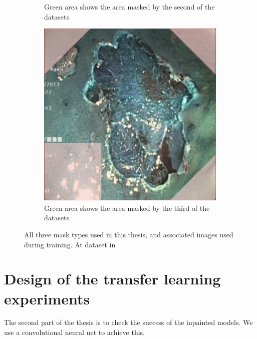 \begin{figure}
\begin{subfigure}[b]{0.3\textwidth}
         \caption{Green area shows the area masked by the second of the datasets}
         \label{fig:GreenMask}
     \end{subfigure}     
     \hfill
     \begin{subfigure}[b]{0.3\textwidth}
         \centering
         \includegraphics[width=\textwidth]{methodology/figures/bothmask.png}
         \caption{Green area shows the area masked by the third of the datasets}
         \label{fig:BothMask}
     \end{subfigure}
     \caption{All three mask types used in this thesis, and associated images used during training. At dataset in}
     \label{fig:masks}
\end{figure}


\section{Design of the transfer learning experiments}
The second part of the thesis is to check the success of the inpainted models. 
We use a convolutional neural net to achieve this.


